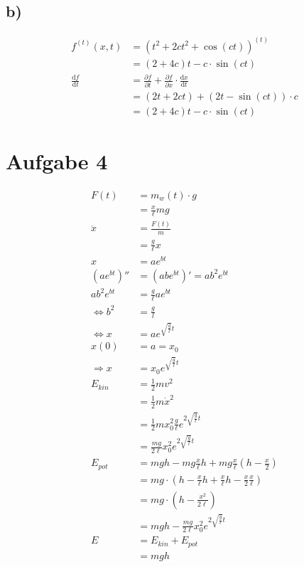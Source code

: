 \documentclass[12pt,a4paper,notitlepage]{article}
\newcommand{\diff}{\mathrm{d}}
\newcommand{\aufgabe}[1]{\section*{\setcounter{section}{#1}Aufgabe #1}}
\begin{document}
\subsection*{b)}
\begin{align}
f^{(t)}(x,t)&=\left(t^2+2ct^2+\cos\left(ct\right)\right)^{(t)}\\
&=(2+4c)t-c\cdot\sin\left(ct\right)\\
\frac{\diff f}{\diff t}&=\frac{\partial f}{\partial t}+\frac{\partial f}{\partial x}\cdot\frac{\diff x}{\diff t}\\
&=\left(2t+2ct\right)+\left(2t-\sin(ct)\right)\cdot c\\
&=\left(2+4c\right)t-c\cdot\sin(ct)
\end{align}
\aufgabe{4} %
\begin{align}
F(t)&=m_w(t)\cdot g\\
&=\frac{x}{\ell}mg\\
\ddot x&=\frac{F(t)}{m}\\
&=\frac{g}{\ell}x\\
x&=ae^{bt}\\
\left(ae^{bt}\right)''&=\left(abe^{bt}\right)'=ab^2e^{bt}\\
ab^2e^{bt}&=\frac{g}{\ell}ae^{bt}\\
\Leftrightarrow b^2&=\frac{g}{l}\\
\Leftrightarrow x&=ae^{\sqrt{\frac{g}{\ell}}t}\\
x(0)&=a=x_0\\
\Rightarrow x&=x_0e^{\sqrt{\frac{g}{\ell}}t}\\
E_{kin}&=\frac{1}{2}mv^2\\
&=\frac{1}{2}m\dot x^2\\
&=\frac{1}{2}mx_0^2\frac{g}{\ell}e^{2\sqrt{\frac{g}{\ell}}t}\\
&=\frac{mg}{2\ell}x_0^2e^{2\sqrt{\frac{g}{\ell}}t}\\
E_{pot}&=mgh-mg\frac{x}{\ell}h+mg\frac{x}{\ell}\left(h-\frac{x}{2}\right)\\
&=mg\cdot\left(h-\frac{x}{\ell}h+\frac{x}{\ell}h-\frac{x}{2}\frac{x}{\ell}\right)\\
&=mg\cdot\left(h-\frac{x^2}{2\ell}\right)\\
&=mgh-\frac{mg}{2\ell}x_0^2e^{2\sqrt{\frac{g}{\ell}}t}\\
E&=E_{kin}+E_{pot}\\
&=mgh
\end{align}
\end{document}
